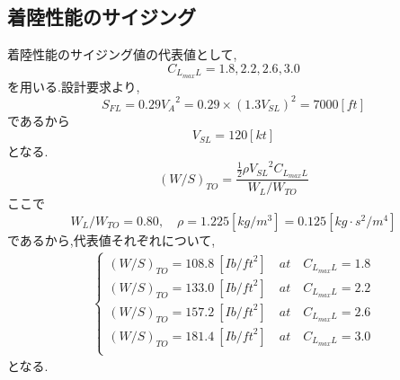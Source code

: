\documentclass[../main]{subfiles}
\begin{document}
  \subsection{着陸性能のサイジング}
    着陸性能のサイジング値の代表値として,
    \begin{equation}
      C_{L_{max}L} = 1.8,2.2,2.6,3.0
    \end{equation}
    を用いる.設計要求より,
    \begin{equation}
      S_{FL} = 0.29{V_A}^2 = 0.29 \times {(1.3V_{SL})}^2 = 7000 [ft]
    \end{equation}
    であるから
    \begin{equation}
      V_{SL} = 120 [kt]
    \end{equation}
    となる.
    \begin{equation}
      {(W/S)}_{TO} = \frac{\frac{1}{2}\rho {V_{SL}}^2 C_{L_{max}L}}{W_L/W_{TO}}
    \end{equation}
    ここで
    \begin{equation}
      W_L/W_{TO} = 0.80, \quad \rho = 1.225[kg/m^3] = 0.125[kg \cdot s^2/m^4]
    \end{equation}
    であるから,代表値それぞれについて,
    \begin{eqnarray}
      \begin{cases}
        (W/S)_{TO} = 108.8 \ [Ib/{ft}^2] \quad at \quad  C_{L_{max}L}=1.8 \\[3mm]
        (W/S)_{TO} = 133.0 \ [Ib/{ft}^2] \quad at \quad  C_{L_{max}L}=2.2 \\[3mm]
        (W/S)_{TO} = 157.2 \ [Ib/{ft}^2] \quad at \quad  C_{L_{max}L}=2.6 \\[3mm]
        (W/S)_{TO} = 181.4 \ [Ib/{ft}^2] \quad at \quad  C_{L_{max}L}=3.0 \\[3mm]
      \end{cases}
    \end{eqnarray}
    となる.
\end{document}
